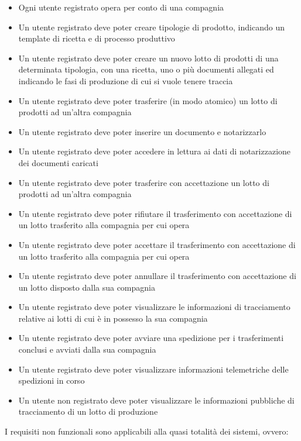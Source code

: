 \documentclass[a4paper,11pt]{article}
\begin{document}
\begin{itemize}
  \item Ogni utente registrato opera per conto di una compagnia
  \item Un utente registrato deve poter creare tipologie di prodotto, indicando un template di ricetta e di processo produttivo
  \item Un utente registrato deve poter creare un nuovo lotto di prodotti di una determinata tipologia, con una ricetta, uno o più documenti allegati ed indicando le fasi di produzione di cui si vuole tenere traccia
  \item Un utente registrato deve poter trasferire (in modo atomico) un lotto di prodotti ad un'altra compagnia
  \item Un utente registrato deve poter inserire un documento e notarizzarlo
  \item Un utente registrato deve poter accedere in lettura ai dati di notarizzazione dei documenti caricati
  \item Un utente registrato deve poter trasferire con accettazione un lotto di prodotti ad un'altra compagnia
  \item Un utente registrato deve poter rifiutare il trasferimento con accettazione di un lotto trasferito alla compagnia per cui opera
  \item Un utente registrato deve poter accettare il trasferimento con accettazione di un lotto trasferito alla compagnia per cui opera
  \item Un utente registrato deve poter annullare il trasferimento con accettazione di un lotto disposto dalla sua compagnia
  \item Un utente registrato deve poter visualizzare le informazioni di tracciamento relative ai lotti di cui è in possesso la sua compagnia
  \item Un utente registrato deve poter avviare una spedizione per i trasferimenti conclusi e avviati dalla sua compagnia
  \item Un utente registrato deve poter visualizzare informazioni telemetriche delle spedizioni in corso
  \item Un utente non registrato deve poter visualizzare le informazioni pubbliche di tracciamento di un lotto di produzione
\end{itemize}

I requisiti non funzionali sono applicabili alla quasi totalità dei sistemi, ovvero:
\end{document}
